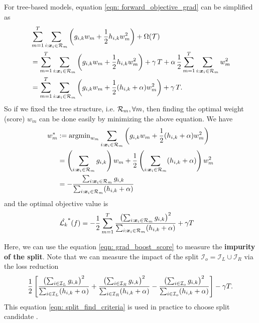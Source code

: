 \documentclass[11pt]{article}
\begin{document}
For tree-based models, equation \eqref{eqn: forward_objective_grad} can be simplified as
\begin{align}
&\sum_{m=1}^{T}\sum_{i: \boldsymbol{x}_{i} \in {\mathcal R}_{m}}\left(g_{i,k} w_{m} + \frac{1}{2}h_{i,k} w_{m}^2\right) +  \Omega({\mathcal T}) \nonumber\\
&=\sum_{m=1}^{T}\sum_{i: \boldsymbol{x}_{i} \in {\mathcal R}_{m}}\left(g_{i,k} w_{m} + \frac{1}{2}h_{i,k} w_{m}^2\right) + \gamma\,T + \alpha\,\frac{1}{2}\sum_{m=1}^{T}\sum_{i: \boldsymbol{x}_{i} \in {\mathcal R}_{m}} w_{m}^2\nonumber\\
&=\sum_{m=1}^{T}\sum_{i: \boldsymbol{x}_{i} \in {\mathcal R}_{m}}\left(g_{i,k} w_{m} + \frac{1}{2}(h_{i,k}+\alpha) w_{m}^2\right) + \gamma\,T.  \label{eqn: forward_objective_grad_tree}
\end{align} So if we fixed the tree structure, i.e. ${\mathcal R}_{m}, \forall m$, then finding the optimal weight (score) $w_{m}$ can be done easily by minimizing the above equation. We have 
\begin{align}
w_{m}^{*}&:= \operatorname{argmin}_{w_{m}}\sum_{i: \boldsymbol{x}_{i} \in {\mathcal R}_{m}}\left(g_{i,k} w_{m} + \frac{1}{2}(h_{i,k}+\alpha) w_{m}^2\right) \nonumber\\
&=\left(\sum_{i: \boldsymbol{x}_{i} \in {\mathcal R}_{m}}g_{i,k}\right)w_{m} + \frac{1}{2}\left(\sum_{i: \boldsymbol{x}_{i} \in {\mathcal R}_{m}}(h_{i,k}+\alpha)\right)w_{m}^2 \nonumber\\
&= -\frac{\sum_{i: \boldsymbol{x}_{i} \in {\mathcal R}_{m}}g_{i,k}}{\sum_{i: \boldsymbol{x}_{i} \in {\mathcal R}_{m}}(h_{i,k}+\alpha)}  \label{eqn: forward_objective_grad_optimal_weight}
\end{align} and the optimal objective value is 
\begin{align}
\hat{ {\mathcal L}_{k}}^{*}(f) &= -\frac{1}{2}\sum_{m=1}^{T}\frac{\left(\sum_{i: \boldsymbol{x}_{i} \in {\mathcal R}_{m}}g_{i,k}\right)^2}{\sum_{i: \boldsymbol{x}_{i} \in {\mathcal R}_{m}}(h_{i,k}+\alpha)} + \gamma T \label{eqn: grad_boost_score}
\end{align}

Here, we can use the equation \eqref{eqn: grad_boost_score} to measure the \textbf{impurity of the split}. Note that we can measure the impact of the split $\mathcal{I}_{o} = \mathcal{I}_{L}\cup \mathcal{I}_{R}$ via the loss reduction 
\begin{align}
 \frac{1}{2}\left[  \frac{\left(\sum_{i\in \mathcal{I}_{L}}g_{i,k}\right)^2}{\sum_{i\in \mathcal{I}_{L}}(h_{i,k}+\alpha)}  + \frac{\left(\sum_{i\in \mathcal{I}_{R}}g_{i,k}\right)^2}{\sum_{i\in \mathcal{I}_{R}}(h_{i,k}+\alpha)} - \frac{\left(\sum_{i\in \mathcal{I}_{o}}g_{i,k}\right)^2}{\sum_{i\in \mathcal{I}_{o}}(h_{i,k}+\alpha)}\right] - \gamma T. \label{eqn: split_find_criteria}
\end{align} This equation \eqref{eqn: split_find_criteria} is used in practice to choose split candidate \citep{chen2016xgboost}.
\end{document}
